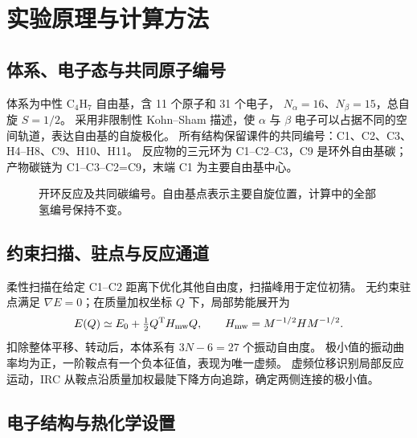 \documentclass[UTF8,a4paper,12pt,fontset=fandol]{ctexart}
\begin{document}
\section{实验原理与计算方法}
\subsection{体系、电子态与共同原子编号}
体系为中性 C$_4$H$_7$ 自由基，含 11 个原子和 31 个电子，
$N_\alpha=16$、$N_\beta=15$，总自旋 $S=1/2$。
采用非限制性 Kohn--Sham 描述，使 $\alpha$ 与 $\beta$ 电子可以占据不同的空间轨道，表达自由基的自旋极化。
所有结构保留课件的共同编号：C1、C2、C3、H4--H8、C9、H10、H11。
反应物的三元环为 C1--C2--C3，C9 是环外自由基碳；
产物碳链为 C1--C3--C2=C9，末端 C1 为主要自由基中心。

\begin{figure}[htbp]
\centering
{}
\caption{开环反应及共同碳编号。自由基点表示主要自旋位置，计算中的全部氢编号保持不变。}
\end{figure}

\subsection{约束扫描、驻点与反应通道}
柔性扫描在给定 C1--C2 距离下优化其他自由度，扫描峰用于定位初猜。
无约束驻点满足 $\nabla E=0$；在质量加权坐标 $Q$ 下，局部势能展开为
\begin{equation}
E(Q)\simeq E_0+\tfrac12 Q^{\mathrm T}H_{\rm mw}Q,
\qquad H_{\rm mw}=M^{-1/2}HM^{-1/2}.
\end{equation}
扣除整体平移、转动后，本体系有 $3N-6=27$ 个振动自由度。
极小值的振动曲率均为正，一阶鞍点有一个负本征值，表现为唯一虚频。
虚频位移识别局部反应运动，IRC 从鞍点沿质量加权最陡下降方向追踪，确定两侧连接的极小值\cite{irc}。

\subsection{电子结构与热化学设置}
\end{document}
